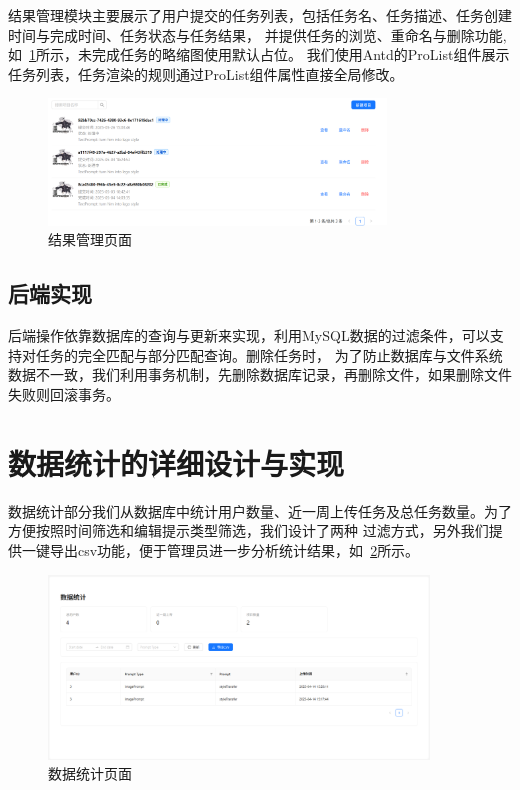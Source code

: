 结果管理模块主要展示了用户提交的任务列表，包括任务名、任务描述、任务创建时间与完成时间、任务状态与任务结果，
并提供任务的浏览、重命名与删除功能,如~\ref{fig:app-result}所示，未完成任务的略缩图使用默认占位。
我们使用Antd的ProList组件展示任务列表，任务渲染的规则通过ProList组件属性直接全局修改。

\begin{figure}[ht]
    \centering
    \includegraphics[width=0.8\textwidth]{source/img/app_result.png}
    \caption{结果管理页面}
    \label{fig:app-result}
\end{figure}

\subsection{后端实现}

后端操作依靠数据库的查询与更新来实现，利用MySQL数据的过滤条件，可以支持对任务的完全匹配与部分匹配查询。删除任务时，
为了防止数据库与文件系统数据不一致，我们利用事务机制，先删除数据库记录，再删除文件，如果删除文件失败则回滚事务。

\section{数据统计的详细设计与实现}

数据统计部分我们从数据库中统计用户数量、近一周上传任务及总任务数量。为了方便按照时间筛选和编辑提示类型筛选，我们设计了两种
过滤方式，另外我们提供一键导出csv功能，便于管理员进一步分析统计结果，如~\ref{fig:app-admin}所示。

\begin{figure}[ht]
    \centering
    \includegraphics[width=0.9\textwidth]{source/img/app_admin.png}
    \caption{数据统计页面}
    \label{fig:app-admin}
\end{figure}

